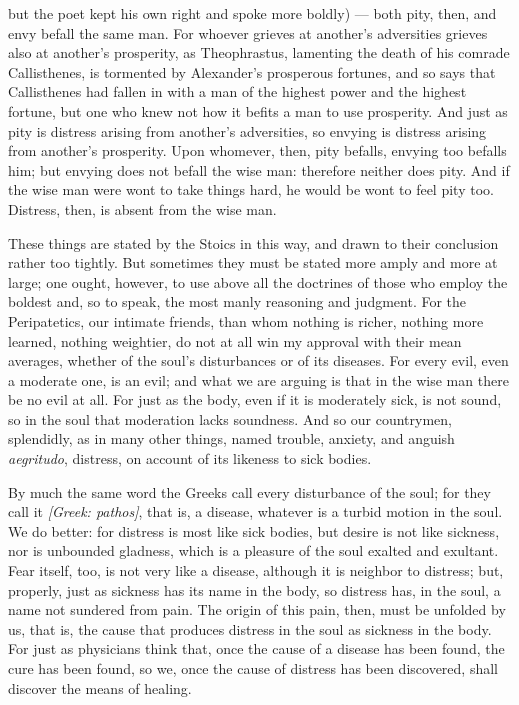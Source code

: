  but the poet kept his own right and spoke more boldly) — both pity, then, and envy befall the same man. For whoever grieves at another's adversities grieves also at another's prosperity, as Theophrastus, lamenting the death of his comrade Callisthenes, is tormented by Alexander's prosperous fortunes, and so says that Callisthenes had fallen in with a man of the highest power and the highest fortune, but one who knew not how it befits a man to use prosperity. And just as pity is distress arising from another's adversities, so envying is distress arising from another's prosperity. Upon whomever, then, pity befalls, envying too befalls him; but envying does not befall the wise man: therefore neither does pity. And if the wise man were wont to take things hard, he would be wont to feel pity too. Distress, then, is absent from the wise man.

 These things are stated by the Stoics in this way, and drawn to their conclusion rather too tightly. But sometimes they must be stated more amply and more at large; one ought, however, to use above all the doctrines of those who employ the boldest and, so to speak, the most manly reasoning and judgment. For the Peripatetics, our intimate friends, than whom nothing is richer, nothing more learned, nothing weightier, do not at all win my approval with their mean averages, whether of the soul's disturbances or of its diseases. For every evil, even a moderate one, is an evil; and what we are arguing is that in the wise man there be no evil at all. For just as the body, even if it is moderately sick, is not sound, so in the soul that moderation lacks soundness. And so our countrymen, splendidly, as in many other things, named trouble, anxiety, and anguish \textit{aegritudo}, distress, on account of its likeness to sick bodies.

 By much the same word the Greeks call every disturbance of the soul; for they call it \textit{[Greek: pathos]}, that is, a disease, whatever is a turbid motion in the soul. We do better: for distress is most like sick bodies, but desire is not like sickness, nor is unbounded gladness, which is a pleasure of the soul exalted and exultant. Fear itself, too, is not very like a disease, although it is neighbor to distress; but, properly, just as sickness has its name in the body, so distress has, in the soul, a name not sundered from pain. The origin of this pain, then, must be unfolded by us, that is, the cause that produces distress in the soul as sickness in the body. For just as physicians think that, once the cause of a disease has been found, the cure has been found, so we, once the cause of distress has been discovered, shall discover the means of healing.

